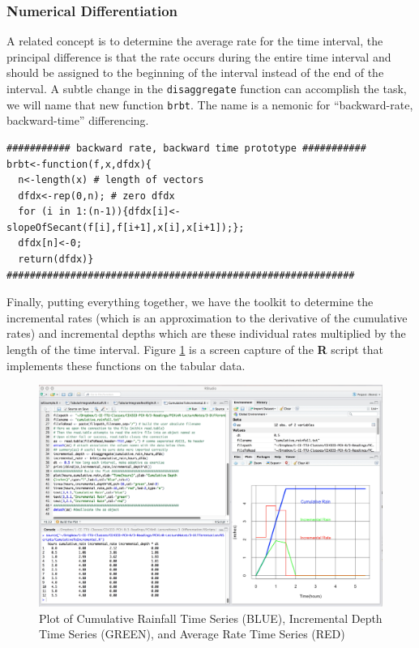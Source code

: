\subsubsection{Numerical Differentiation}

A related concept is to determine the average rate for the time interval, the principal difference is that the rate occurs during the entire time interval and should be assigned to the beginning of the interval instead of the end of the interval.  A subtle change in the \texttt{disaggregate} function can accomplish the task, we will name that new function \texttt{brbt}.  The name is a nemonic for ``backward-rate, backward-time'' differencing.

\begin{lstlisting}[caption=R code demonstrating the prototype function \texttt{brbt()} , label=lst:BrBt]
########### backward rate, backward time prototype ###########
brbt<-function(f,x,dfdx){
  n<-length(x) # length of vectors
  dfdx<-rep(0,n); # zero dfdx
  for (i in 1:(n-1)){dfdx[i]<-slopeOfSecant(f[i],f[i+1],x[i],x[i+1]);};
  dfdx[n]<-0;
  return(dfdx)}
############################################################
\end{lstlisting}

Finally, putting everything together, we have the toolkit to determine the incremental rates (which is an approximation to the derivative of the cumulative rates) and incremental depths which are these individual rates multiplied by the length of the time interval.
Figure \ref{fig:processed_rain_plot} is a screen capture of the \textbf{R} script that implements these functions on the tabular data.

\begin{figure}[h!] %
   \centering
   \includegraphics[width=6in]{./3-Differentation/processed_rain_plot.jpg} 
   \caption{Plot of Cumulative Rainfall Time Series (BLUE), Incremental Depth Time Series (GREEN), and Average Rate Time Series (RED)}
   \label{fig:processed_rain_plot}
\end{figure}

